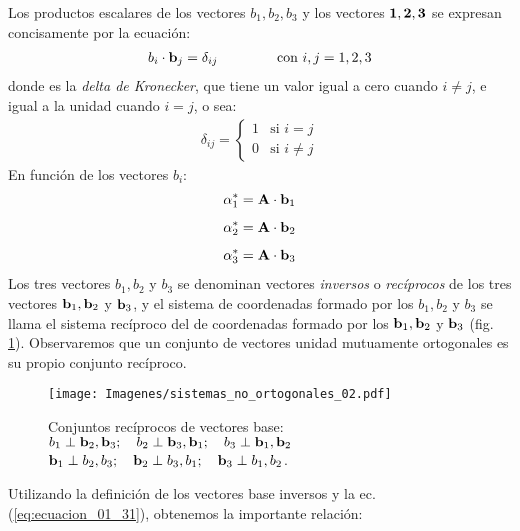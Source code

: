 Los productos escalares de los vectores $b_{1}, b_{2}, b_{3}$ y los vectores $\vb{1}, \vb{2}, \vb{3}$ se expresan concisamente por la ecuación:
\begin{align}
    b_{i} \cdot \vb{b}_{j} = \delta_{ij} \hspace{1.5cm} \text{con } i, j = 1, 2, 3
    \label{eq:ecuacion_01_38}
\end{align}
donde es la \emph{delta de Kronecker}, que tiene un valor igual a cero cuando $i \neq j$, e igual a la unidad cuando $i = j$, o sea:
\begin{align}
    \delta_{ij} = \begin{cases}
        1 & \text{si } i = j \\[0.5em]
        0 & \text{si } i \neq j
    \end{cases}
    \label{eq:ecuacion_01_39}
\end{align}
En función de los vectores $b_{i}$:
\begin{align}
\begin{aligned}
    \alpha_{1}^{*} = \vb{A} \cdot \vb{b}_{1} \\[0.5em]
    \alpha_{2}^{*} = \vb{A} \cdot \vb{b}_{2} \\[0.5em]
    \alpha_{3}^{*} = \vb{A} \cdot \vb{b}_{3}
\end{aligned}
    \label{eq:ecuacion_01_40}   
\end{align}
Los tres vectores $b_{1}, b_{2}$ y $b_{3}$ se denominan vectores \emph{inversos} o \emph{recíprocos} de los tres vectores $\vb{b}_{1}, \vb{b}_{2}$ y $\vb{b}_{3}$, y el sistema de coordenadas formado por los $b_{1}, b_{2}$ y $b_{3}$ se llama el sistema recíproco del de coordenadas formado por los $\vb{b}_{1}, \vb{b}_{2}$ y $\vb{b}_{3}$ (fig. \ref{fig:figura_01_13}). Observaremos que un conjunto de vectores unidad mutuamente ortogonales es su propio conjunto recíproco.
\begin{figure}[H]
    \centering
    \texttt{[image: Imagenes/sistemas\_no\_ortogonales\_02.pdf]}
    \caption{Conjuntos recíprocos de vectores base: \\
    \centering $b_{1} \perp \vb{b}_{2}, \vb{b}_{3}; \quad b_{2} \perp \vb{b}_{3}, \vb{b}_{1}; \quad b_{3} \perp \vb{b}_{1}, \vb{b}_{2}$ \break \hfill
    \centering $\vb{b}_{1} \perp b_{2}, b_{3}; \quad \vb{b}_{2} \perp b_{3}, b_{1}; \quad \vb{b}_{3} \perp b_{1}, b_{2}$.}
    \label{fig:figura_01_13}
\end{figure}
Utilizando la definición de los vectores base inversos y la ec. (\ref{eq:ecuacion_01_31}), obtenemos la importante relación:
